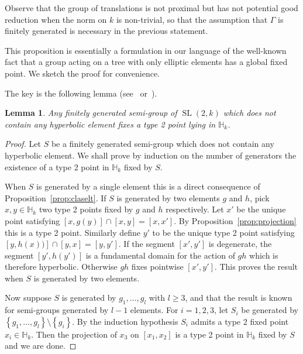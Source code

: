 \documentclass[10pt]{amsart}
\newtheorem{lemm}[theo]{Lemma}\newtheorem{prop}[theo]{Proposition}\newtheorem{coro}[theo]{Corollary}\newtheorem{conj}[theo]{Conjecture}
\theoremstyle{definition}\newtheorem{defi}[theo]{Definition}\newtheorem{rema}[theo]{Remark}\newtheorem{exam}[theo]{Example}\newtheorem{exem}[theo]{Example}\newtheorem{nota}[theo]{Notation}
\DeclareMathOperator{\SL}{SL}
\newcommand{\hh}{\mathbb{H}}
\newcommand{\set}[1]{\left\{#1\right\}}
\begin{document}
Observe that the group of translations is not proximal but has not potential good reduction when the norm on $k$ is non-trivial, so that the assumption that $\Gamma$ is finitely generated is necessary in the previous statement.


This proposition is essentially a formulation in our language of the well-known fact that a group acting on a tree with only elliptic elements has a global fixed point. We sketch the proof for convenience.

The key is the following lemma (see~\cite[Lem.~10.4]{kapovich} or~\cite[Lem.~40]{otal}).

\begin{lemm}\label{lem:semi group}
Any finitely generated semi-group of $\SL(2,k)$ which does not contain any hyperbolic element fixes a type 2 point lying in $\hh_k$.
\end{lemm}

\begin{proof}
Let $S$ be a finitely generated semi-group which does not contain any hyperbolic element. We shall prove by induction on the number of generators the existence of a type 2 point in $\hh_k$ fixed by $S$.

When $S$ is generated by a single element this is a direct consequence of Proposition~\ref{prop:claselt}. If $S$ is generated by two elements $g$ and $h$, pick $x,y\in \hh_k$ two type 2 points fixed by $g$ and $h$ respectively. Let $x'$ be the unique point satisfying $[x,g(y)] \cap [x,y] = [x,x']$. By Proposition~\ref{prop:projection} this is a type 2 point. Similarly define $y'$ to be the unique type 2 point satisfying $[y,h(x))] \cap [y,x] = [y,y']$. If the segment $[x',y']$ is degenerate, the segment $[y',h(y')]$ is a fundamental domain for the action of $gh$ which is therefore hyperbolic. Otherwise $gh$ fixes pointwise $[x',y']$. This proves the result when $S$ is generated by two elements.

Now suppose $S$ is generated by $g_1, \ldots, g_l$ with $l\ge 3$, and that the result is known for semi-groups generated by $l-1$ elements. For $i =1,2,3$, let $S_i$ be generated by $\set{ g_1, \ldots, g_l}\setminus \set{g_i}$. By the induction hypothesis $S_i$ admits a type 2 fixed point $x_i \in \hh_k$. Then the projection of $x_3$ on $[x_1, x_2]$ is a type 2 point in $\hh_k$ fixed by $S$ and we are done.
\end{proof}
\end{document}
